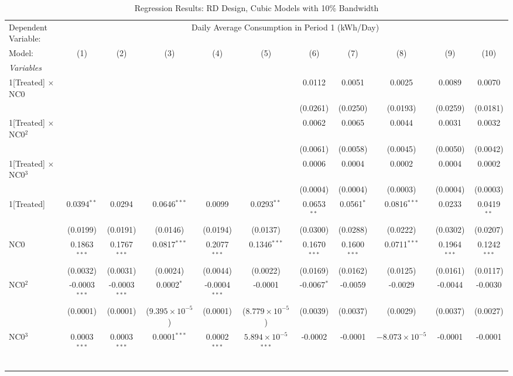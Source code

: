 \begin{table}[htbp]
\centering
\caption{\label{Table:Regression-Results_RD_Cubic_BW-10} Regression Results: RD Design, Cubic Models with 10\% Bandwidth}
\begin{tabular}{lcccccccccc}
\tabularnewline\toprule\toprule
Dependent Variable:&\multicolumn{10}{c}{Daily Average Consumption in Period 1 (kWh/Day)}\\
Model:&(1) & (2) & (3) & (4) & (5) & (6) & (7) & (8) & (9) & (10)\\
\midrule
\emph{Variables}&   &   &   &   &   &   &   &   &   &  \\
1[Treated] $\times $ NC0&   &    &    &    &    & 0.0112 & 0.0051 & 0.0025 & 0.0089 & 0.0070\\
  &   &    &    &    &    & (0.0261) & (0.0250) & (0.0193) & (0.0259) & (0.0181)\\
1[Treated] $\times $ NC0$^2$&   &    &    &    &    & 0.0062 & 0.0065 & 0.0044 & 0.0031 & 0.0032\\
  &   &    &    &    &    & (0.0061) & (0.0058) & (0.0045) & (0.0050) & (0.0042)\\
1[Treated] $\times $ NC0$^3$&   &    &    &    &    & 0.0006 & 0.0004 & 0.0002 & 0.0004 & 0.0002\\
  &   &    &    &    &    & (0.0004) & (0.0004) & (0.0003) & (0.0004) & (0.0003)\\
1[Treated]&0.0394$^{**}$ & 0.0294 & 0.0646$^{***}$ & 0.0099 & 0.0293$^{**}$ & 0.0653$^{**}$ & 0.0561$^{*}$ & 0.0816$^{***}$ & 0.0233 & 0.0419$^{**}$\\
  &(0.0199) & (0.0191) & (0.0146) & (0.0194) & (0.0137) & (0.0300) & (0.0288) & (0.0222) & (0.0302) & (0.0207)\\
NC0&0.1863$^{***}$ & 0.1767$^{***}$ & 0.0817$^{***}$ & 0.2077$^{***}$ & 0.1346$^{***}$ & 0.1670$^{***}$ & 0.1600$^{***}$ & 0.0711$^{***}$ & 0.1964$^{***}$ & 0.1242$^{***}$\\
  &(0.0032) & (0.0031) & (0.0024) & (0.0044) & (0.0022) & (0.0169) & (0.0162) & (0.0125) & (0.0161) & (0.0117)\\
NC0$^2$&-0.0003$^{***}$ & -0.0003$^{***}$ & 0.0002$^{*}$ & -0.0004$^{***}$ & -0.0001 & -0.0067$^{*}$ & -0.0059 & -0.0029 & -0.0044 & -0.0030\\
  &(0.0001) & (0.0001) & ($9.395\times 10^{-5}$) & (0.0001) & ($8.779\times 10^{-5}$) & (0.0039) & (0.0037) & (0.0029) & (0.0037) & (0.0027)\\
NC0$^3$&0.0003$^{***}$ & 0.0003$^{***}$ & 0.0001$^{***}$ & 0.0002$^{***}$ & $5.894\times 10^{-5}$$^{***}$ & -0.0002 & -0.0001 & $-8.073\times 10^{-5}$ & -0.0001 & -0.0001\\
$$
\end{tabular}
\end{table}

